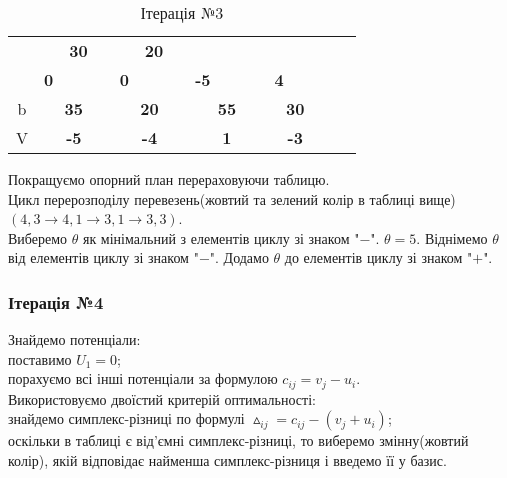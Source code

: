 \documentclass[a4paper, 12pt]{article}
\begin{document}
\begin{table}[H]
\begin{tabular}{|c|cccc|cccc|cccc|cccc|rr|}
\cline{2-2}\cline{5-5}\cline{9-10}\cline{13-13}\cline{17-17}          &       & \multicolumn{2}{c}{\multirow{2}[2]{*}{\textbf{30}}} &       &       & \multicolumn{2}{c}{\multirow{2}[2]{*}{\textbf{20}}} &       &       & \multicolumn{2}{c}{\multirow{2}[2]{*}{}} &       &       & \multicolumn{2}{c}{\multirow{2}[2]{*}{}} &       & \multicolumn{1}{c|}{} &  \bigstrut[t]\\
          &       & \multicolumn{2}{c}{} &       &       & \multicolumn{2}{c}{} &       &       & \multicolumn{2}{c}{} &       &       & \multicolumn{2}{c}{} &       & \multicolumn{1}{c|}{} &  \bigstrut[b]\\
\cline{2-2}\cline{6-6}\cline{10-10}\cline{14-14}          & \multicolumn{1}{c|}{\textbf{0}} &       &       &       & \multicolumn{1}{c|}{\textbf{0}} & \multicolumn{2}{c}{} &       & \multicolumn{1}{c|}{\textbf{-5}} &       &       &       & \multicolumn{1}{c|}{\textbf{4}} & \multicolumn{2}{c}{} &       & \multicolumn{1}{c|}{} &  \bigstrut\\
    \hline
    b     & \multicolumn{4}{c|}{\textbf{35}} & \multicolumn{4}{c|}{\textbf{20}} & \multicolumn{4}{c|}{\textbf{55}} & \multicolumn{4}{c|}{\textbf{30}} &       &  \bigstrut\\
\cline{1-17}    V     & \multicolumn{4}{c|}{\textbf{-5}} & \multicolumn{4}{c|}{\textbf{-4}} & \multicolumn{4}{c|}{\textbf{1}} & \multicolumn{4}{c|}{\textbf{-3}} &       &  \bigstrut\\
    \hline
    \end{tabular}%
  \caption{Ітерація №3}
  \label{tab:it3}%
\end{table}%

Покращуємо опорний план перераховуючи таблицю.\\

Цикл перерозподілу перевезень(жовтий та зелений колір в таблиці вище) $(4,3 \longrightarrow 4,1 \longrightarrow 3,1 \longrightarrow 3,3)$.\\

Виберемо $\theta$ як мінімальний з елементів циклу зі знаком "$-$". $\theta = 5$. Віднімемо $\theta$ від елементів циклу зі знаком "$-$". Додамо $\theta$ до елементів циклу зі знаком "$+$".

\subsubsection{Ітерація №4}

Знайдемо потенціали:\\
поставимо $U_1 = 0$;\\
порахуємо всі інші потенціали за формулою $c_{ij} = v_j - u_i$.\\
Використовуємо двоїстий критерій оптимальності:\\
знайдемо симплекс-різниці по формулі $\vartriangle_{ij} = c_{ij} - (v_j + u_i) $;\\
оскільки в таблиці є від'ємні симплекс-різниці, то виберемо змінну(жовтий колір), якій відповідає найменша симплекс-різниця і введемо її у базис.
\end{document}
